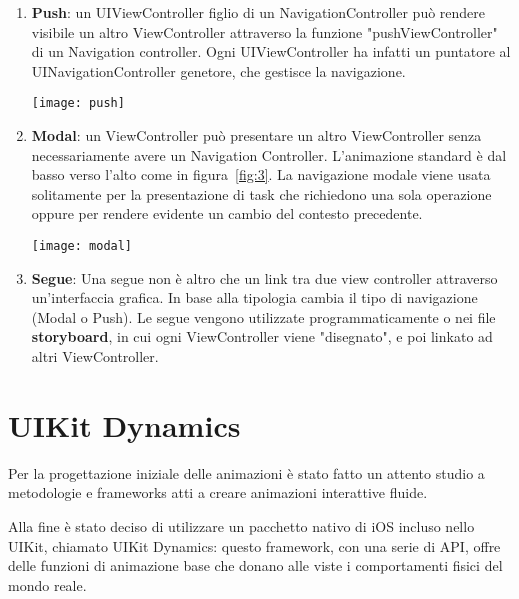 \begin{enumerate}
    \item{\textbf{Push}: un UIViewController figlio di un NavigationController può rendere
    visibile un altro ViewController attraverso la funzione 
    "pushViewController" di un Navigation controller. Ogni UIViewController ha
    infatti un puntatore al UINavigationController genetore, che gestisce la navigazione.

    \par
    \begin{minipage}{\linewidth}
        \centering
        \texttt{[image: push]}
        \label{fig:2}
    \end{minipage}
    }
    \item{ \textbf{Modal}: un ViewController può presentare un altro ViewController senza necessariamente avere un 
        Navigation Controller. L'animazione standard è dal basso verso l'alto come in figura~\ref{fig:3}. La navigazione modale viene
        usata solitamente per la presentazione di task che richiedono una sola operazione oppure per rendere evidente un cambio del contesto precedente.
        \par
        \begin{minipage}{\linewidth}
            \centering
            \texttt{[image: modal]}
            \label{fig:3}
        \end{minipage}
    }
    \item{\textbf{Segue}: Una segue non è altro che un link tra due view controller attraverso un'interfaccia
        grafica. In base alla tipologia cambia il tipo di navigazione (Modal o Push). Le segue vengono utilizzate programmaticamente o nei file \textbf{storyboard}, in cui
        ogni ViewController viene "disegnato", e poi linkato ad altri ViewController.
    }
\end{enumerate}

\section{UIKit Dynamics}

Per la progettazione iniziale delle animazioni è stato fatto un attento studio a metodologie e frameworks
atti a creare animazioni interattive fluide.

Alla fine è stato deciso di utilizzare un pacchetto
nativo di iOS incluso nello UIKit\cite{uikit}, chiamato UIKit Dynamics\cite{uidynamics}: questo framework,
con una serie di API, offre delle funzioni di animazione base che 
donano alle viste i comportamenti fisici del mondo reale.

